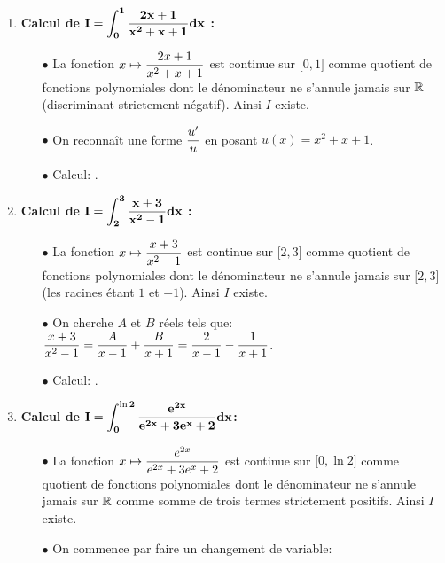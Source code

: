 \documentclass[a4paper, 11pt,reqno]{article}
\begin{document}
\begin{correction}  \;
	\begin{enumerate}
		\item \textbf{Calcul de $\mathbf{ \displaystyle I =  \int_{0}^{1}   \displaystyle\frac{2x+1}{x^2+x+1} dx}$ :}
		      \begin{itemize}
			      \item[$\bullet$]  La fonction $x\mapsto  \displaystyle\frac{2x+1}{x^2+x+1}$ est continue sur $\lbrack 0,1\rbrack$ comme quotient de fonctions polynomiales dont le d\'enominateur ne s'annule jamais sur $\mathbb{R}$ (discriminant strictement n\'egatif). Ainsi $I$ existe.
			      \item[$\bullet$] On reconna\^it une forme $\displaystyle \frac{u'}{u}$ en posant $u(x) = x^2+x+1$.
			      \item[$\bullet$] Calcul: .
		      \end{itemize}
		\item \textbf{Calcul de $\mathbf{ \displaystyle I=  \int_{2}^{3}   \displaystyle\frac{x+3}{x^2-1} dx}$ :}
		      \begin{itemize}
			      \item[$\bullet$] La fonction $x\mapsto \displaystyle\frac{x+3}{x^2-1}$ est continue sur $\lbrack 2,3\rbrack$ comme quotient de fonctions polynomiales dont le d\'enominateur ne s'annule jamais sur $\lbrack 2,3\rbrack$ (les racines \'etant $1$ et $-1$). Ainsi $I$ existe.
			      \item[$\bullet$] On cherche $A$ et $B$ r\'eels tels que: $ \displaystyle\frac{x+3}{x^2-1}=\displaystyle\frac{A}{x-1}+\displaystyle\frac{B}{x+1}=\displaystyle\frac{2}{x-1}-\displaystyle\frac{1}{x+1}$.
			      \item[$\bullet$] Calcul: .
		      \end{itemize}
		\item \textbf{Calcul de $\mathbf{ \displaystyle I=\int_0^{\ln{2}} \displaystyle\frac{e^{2x}}{e^{2x}+3e^x+2  } dx }$:}
		      \begin{itemize}
			      \item[$\bullet$] La fonction $x\mapsto \displaystyle\frac{e^{2x}}{e^{2x}+3e^x+2  }$ est continue sur $\lbrack 0,\ln{2}\rbrack$ comme quotient de fonctions polynomiales dont le d\'enominateur ne s'annule jamais sur $\mathbb{R}$ comme somme de trois termes strictement positifs. Ainsi $I$ existe.
			      \item[$\bullet$] On commence par faire un changement de variable:

\end{itemize}
\end{enumerate}
\end{correction}
\end{document}
